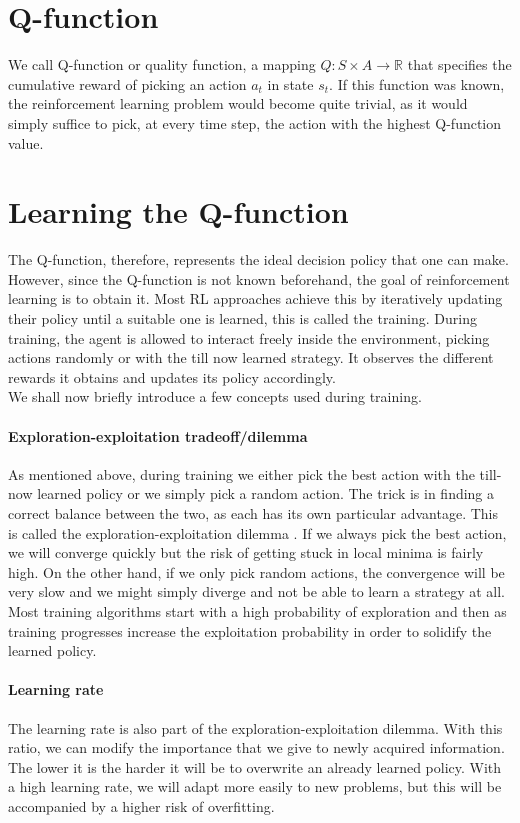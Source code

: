  \section{Q-function}
 We call Q-function or quality function, a mapping $Q:S \times A \rightarrow \mathbb{R}$ that specifies the cumulative reward of picking an action $a_t$ in state $s_t$. If this function was known, the reinforcement learning problem would become quite trivial, as it would simply suffice to pick, at every time step, the action with the highest Q-function value.
 
 \section{Learning the Q-function} 
The Q-function, therefore, represents the ideal decision policy that one can make. However, since the Q-function is not known beforehand, the goal of reinforcement learning is to obtain it. Most RL approaches achieve this by iteratively updating their policy until a suitable one is learned, this is called the training. During training, the agent is allowed to interact freely inside the environment, picking actions randomly or with the till now learned strategy. It observes the different rewards it obtains and updates its policy accordingly.\\ 
We shall now briefly introduce a few concepts used during training.
\paragraph{Exploration-exploitation tradeoff/dilemma}
As mentioned above, during training we either pick the best action with the till-now learned policy or we simply pick a random action. The trick is in finding a correct balance between the two, as each has its own particular advantage. This is called the exploration-exploitation dilemma \cite{yogeswaran2012reinforcement}. If we always pick the best action, we will converge quickly but the risk of getting stuck in local minima is fairly high. On the other hand, if we only pick random actions, the convergence will be very slow and we might simply diverge and not be able to learn a strategy at all. Most training algorithms start with a high probability of exploration and then as training progresses increase the exploitation probability in order to solidify the learned policy.
\paragraph{Learning rate}
The learning rate is also part of the exploration-exploitation dilemma. With this ratio, we can modify the importance that we give to newly acquired information. The lower it is the harder it will be to overwrite an already learned policy. With a high learning rate, we will adapt more easily to new problems, but this will be accompanied by a higher risk of overfitting.

